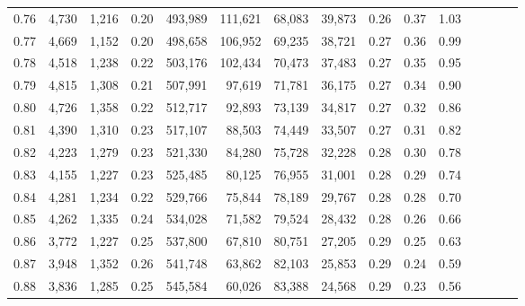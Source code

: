 \begin{tabular}{rrrcrrrrrrrrrrr}
0.76 &   4,730 &   1,216 &                                       0.20 &  493,989 &  111,621 &   68,083 &   39,873 &  0.26 &  0.37 &                         1.03 \\
0.77 &   4,669 &   1,152 &                                       0.20 &  498,658 &  106,952 &   69,235 &   38,721 &  0.27 &  0.36 &                         0.99 \\
0.78 &   4,518 &   1,238 &                                       0.22 &  503,176 &  102,434 &   70,473 &   37,483 &  0.27 &  0.35 &                         0.95 \\
0.79 &   4,815 &   1,308 &                                       0.21 &  507,991 &   97,619 &   71,781 &   36,175 &  0.27 &  0.34 &                         0.90 \\
0.80 &   4,726 &   1,358 &                                       0.22 &  512,717 &   92,893 &   73,139 &   34,817 &  0.27 &  0.32 &                         0.86 \\
0.81 &   4,390 &   1,310 &                                       0.23 &  517,107 &   88,503 &   74,449 &   33,507 &  0.27 &  0.31 &                         0.82 \\
0.82 &   4,223 &   1,279 &                                       0.23 &  521,330 &   84,280 &   75,728 &   32,228 &  0.28 &  0.30 &                         0.78 \\
0.83 &   4,155 &   1,227 &                                       0.23 &  525,485 &   80,125 &   76,955 &   31,001 &  0.28 &  0.29 &                         0.74 \\
0.84 &   4,281 &   1,234 &                                       0.22 &  529,766 &   75,844 &   78,189 &   29,767 &  0.28 &  0.28 &                         0.70 \\
0.85 &   4,262 &   1,335 &                                       0.24 &  534,028 &   71,582 &   79,524 &   28,432 &  0.28 &  0.26 &                         0.66 \\
0.86 &   3,772 &   1,227 &                                       0.25 &  537,800 &   67,810 &   80,751 &   27,205 &  0.29 &  0.25 &                         0.63 \\
0.87 &   3,948 &   1,352 &                                       0.26 &  541,748 &   63,862 &   82,103 &   25,853 &  0.29 &  0.24 &                         0.59 \\
0.88 &   3,836 &   1,285 &                                       0.25 &  545,584 &   60,026 &   83,388 &   24,568 &  0.29 &  0.23 &                         0.56 \\

\end{tabular}
